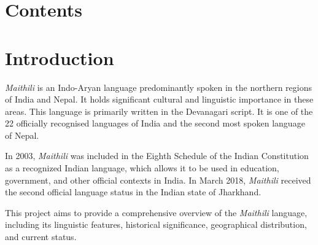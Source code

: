 \documentclass[17pt]{extarticle}
\begin{document}
\section*{\textbf{Contents}}

\section*{\textbf{Introduction}}

\hspace*{0.5cm}\emph{Maithili} is an Indo-Aryan language predominantly spoken in the northern regions of India and Nepal. It holds significant cultural and linguistic importance in these areas. This language is primarily written in the Devanagari script. It is one of the 22 officially recognised languages of India and the second most spoken language of Nepal.

In 2003, \emph{Maithili} was included in the Eighth Schedule of the Indian Constitution as a recognized Indian language, which allows it to be used in education, government, and other official contexts in India. In March 2018, \emph{Maithili} received the second official language status in the Indian state of Jharkhand.

This project aims to provide a comprehensive overview of the \emph{Maithili} language, including its linguistic features, historical significance, geographical distribution, and current status.
\end{document}
